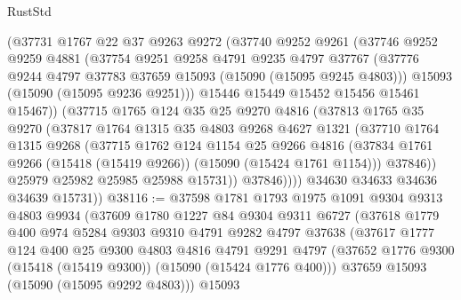 \begin{lexlean}{RustStd}
\begin{coremodule}
            (@37731
              @1767
              @22
              @37
              @9263
              @9272
              (@37740
                @9252
                @9261
                (@37746
                  @9252
                  @9259
                  @4881
                  (@37754
                    @9251
                    @9258
                    @4791
                    @9235
                    @4797
                    @37767
                    (@37776 @9244 @4797 @37783 @37659 @15093 (@15090 (@15095 @9245 @4803)))
                    @15093
                    (@15090 (@15095 @9236 @9251)))
                  @15446
                  @15449
                  @15452
                  @15456
                  @15461
                  @15467))
              (@37715
                @1765
                @124
                @35
                @25
                @9270
                @4816
                (@37813
                  @1765
                  @35
                  @9270
                  (@37817
                    @1764
                    @1315
                    @35
                    @4803
                    @9268
                    @4627
                    @1321
                    (@37710
                      @1764
                      @1315
                      @9268
                      (@37715
                        @1762
                        @124
                        @1154
                        @25
                        @9266
                        @4816
                        (@37834 @1761 @9266 (@15418 (@15419 @9266)) (@15090 (@15424 @1761 @1154)))
                        @37846))
                    @25979
                    @25982
                    @25985
                    @25988
                    @15731))
                @37846))))
        @34630
        @34633
        @34636
        @34639
        @15731))
@38116 := @37598
    @1781
    @1793
    @1975
    @1091
    @9304
    @9313
    @4803
    @9934
    (@37609
      @1780
      @1227
      @84
      @9304
      @9311
      @6727
      (@37618
        @1779
        @400
        @974
        @5284
        @9303
        @9310
        @4791
        @9282
        @4797
        @37638
        (@37617
          @1777
          @124
          @400
          @25
          @9300
          @4803
          @4816
          @4791
          @9291
          @4797
          (@37652 @1776 @9300 (@15418 (@15419 @9300)) (@15090 (@15424 @1776 @400)))
          @37659
          @15093
          (@15090 (@15095 @9292 @4803)))
        @15093

\end{coremodule}
\end{lexlean}
